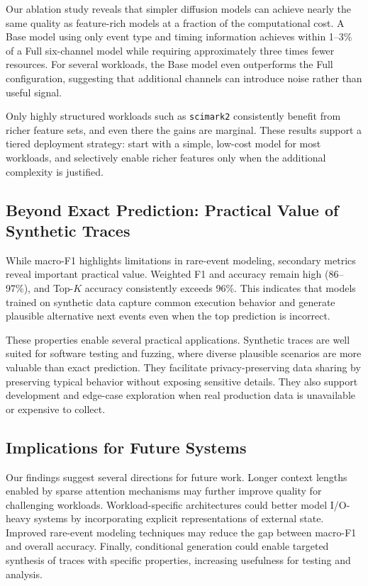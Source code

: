 Our ablation study reveals that simpler diffusion models can achieve nearly the same quality as feature-rich models at a fraction of the computational cost. A Base model using only event type and timing information achieves within 1--3\% of a Full six-channel model while requiring approximately three times fewer resources. For several workloads, the Base model even outperforms the Full configuration, suggesting that additional channels can introduce noise rather than useful signal.

Only highly structured workloads such as \texttt{scimark2} consistently benefit from richer feature sets, and even there the gains are marginal. These results support a tiered deployment strategy: start with a simple, low-cost model for most workloads, and selectively enable richer features only when the additional complexity is justified.

\subsection{Beyond Exact Prediction: Practical Value of Synthetic Traces}

While macro-F1 highlights limitations in rare-event modeling, secondary metrics reveal important practical value. Weighted F1 and accuracy remain high (86--97\%), and Top-$K$ accuracy consistently exceeds 96\%. This indicates that models trained on synthetic data capture common execution behavior and generate plausible alternative next events even when the top prediction is incorrect.

These properties enable several practical applications. Synthetic traces are well suited for software testing and fuzzing, where diverse plausible scenarios are more valuable than exact prediction. They facilitate privacy-preserving data sharing by preserving typical behavior without exposing sensitive details. They also support development and edge-case exploration when real production data is unavailable or expensive to collect.

\subsection{Implications for Future Systems}

Our findings suggest several directions for future work. Longer context lengths enabled by sparse attention mechanisms may further improve quality for challenging workloads. Workload-specific architectures could better model I/O-heavy systems by incorporating explicit representations of external state. Improved rare-event modeling techniques may reduce the gap between macro-F1 and overall accuracy. Finally, conditional generation could enable targeted synthesis of traces with specific properties, increasing usefulness for testing and analysis.

